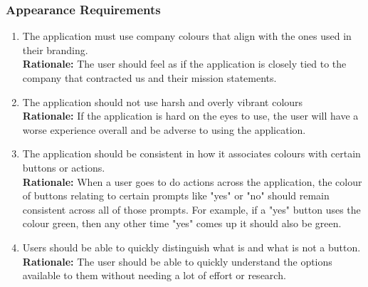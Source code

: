 \documentclass[]{article}
\begin{document}
\subsubsection{Appearance Requirements}
\label{ssub:appearance_requirements}
\begin{enumerate}[label={LF-A\arabic*.}]
	\item The application must use company colours that align with the ones used in their branding.\\
	\textbf{Rationale:} The user should feel as if the application is closely tied to the company that contracted us and their mission statements.
	\item The application should not use harsh and overly vibrant colours\\
	\textbf{Rationale:} If the application is hard on the eyes to use, the user will have a worse experience overall and be adverse to using the application.
	\item The application should be consistent in how it associates colours with certain buttons or actions.\\
	\textbf{Rationale:} When a user goes to do actions across the application, the colour of buttons relating to certain prompts like "yes" or "no" should remain consistent across all of those prompts. For example, if a "yes" button uses the colour green, then any other time "yes" comes up it should also be green.
	\item Users should be able to quickly distinguish what is and what is not a button.\\
	\textbf{Rationale:} The user should be able to quickly understand the options available to them without needing a lot of effort or research. 
\end{enumerate}
\end{document}
